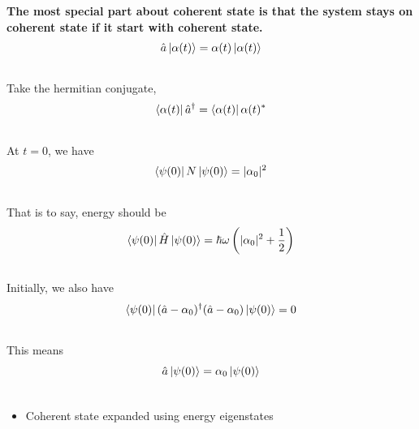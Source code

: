 \documentclass[letterpaper,10pt,english]{sphinxmanual}
\newcommand{\bra}[1]{\left\langle #1\right|}
\newcommand{\ket}[1]{\left| #1\right\rangle}
\begin{document}
\textbf{The most special part about coherent state is that the system stays on coherent state if it start with coherent state.}
\begin{gather}
\begin{split}\hat a \ket{\alpha(t)} = \alpha(t) \ket{\alpha(t)}\end{split}\notag\\\begin{split}\end{split}\notag
\end{gather}
Take the hermitian conjugate,
\begin{gather}
\begin{split}\bra{\alpha(t)} \hat a^\dagger  = \bra{\alpha(t)}\alpha(t)^*\end{split}\notag\\\begin{split}\end{split}\notag
\end{gather}
At $t=0$, we have
\begin{gather}
\begin{split}\bra{\psi(0)} N \ket{\psi(0)} = \vert \alpha_0 \vert ^2\end{split}\notag\\\begin{split}\end{split}\notag
\end{gather}
That is to say, energy should be
\begin{gather}
\begin{split}\bra{\psi(0)} \hat H \ket{\psi(0)} = \hbar \omega \left( \vert \alpha_0 \vert^2 + \frac{1}{2} \right)\end{split}\notag\\\begin{split}\end{split}\notag
\end{gather}
Initially, we also have
\begin{gather}
\begin{split}\bra{\psi(0)} (\hat a - \alpha_0)^\dagger (\hat a-\alpha_0) \ket{\psi(0)} = 0\end{split}\notag\\\begin{split}\end{split}\notag
\end{gather}
This means
\begin{gather}
\begin{split}\hat a \ket{\psi(0)} = \alpha_0 \ket{\psi(0)}\end{split}\notag\\\begin{split}\end{split}\notag
\end{gather}\begin{itemize}
\item {} 
Coherent state expanded using energy eigenstates

\end{itemize}
\end{document}
